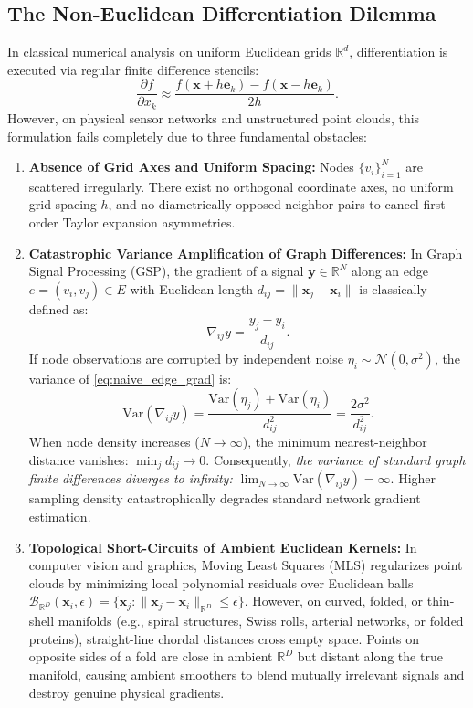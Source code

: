 \documentclass[11pt,a4paper]{article}
\theoremstyle{definition}
\begin{document}
\subsection{The Non-Euclidean Differentiation Dilemma}
In classical numerical analysis on uniform Euclidean grids $\mathbb{R}^d$, differentiation is executed via regular finite difference stencils:
\begin{equation}
\frac{\partial f}{\partial x_k} \approx \frac{f(\mathbf{x} + h \mathbf{e}_k) - f(\mathbf{x} - h \mathbf{e}_k)}{2h}.
\end{equation}
However, on physical sensor networks and unstructured point clouds, this formulation fails completely due to three fundamental obstacles:
\begin{enumerate}
    \item \textbf{Absence of Grid Axes and Uniform Spacing:} Nodes $\{v_i\}_{i=1}^N$ are scattered irregularly. There exist no orthogonal coordinate axes, no uniform grid spacing $h$, and no diametrically opposed neighbor pairs to cancel first-order Taylor expansion asymmetries.
    \item \textbf{Catastrophic Variance Amplification of Graph Differences:} In Graph Signal Processing (GSP), the gradient of a signal $\mathbf{y} \in \mathbb{R}^N$ along an edge $e = (v_i, v_j) \in E$ with Euclidean length $d_{ij} = \|\mathbf{x}_j - \mathbf{x}_i\|$ is classically defined as:
    \begin{equation}
    \nabla_{ij} y = \frac{y_j - y_i}{d_{ij}}.
    \label{eq:naive_edge_grad}
    \end{equation}
    If node observations are corrupted by independent noise $\eta_i \sim \mathcal{N}(0, \sigma^2)$, the variance of \eqref{eq:naive_edge_grad} is:
    \begin{equation}
    \text{Var}(\nabla_{ij} y) = \frac{\text{Var}(\eta_j) + \text{Var}(\eta_i)}{d_{ij}^2} = \frac{2\sigma^2}{d_{ij}^2}.
    \end{equation}
    When node density increases ($N \to \infty$), the minimum nearest-neighbor distance vanishes: $\min_{j} d_{ij} \to 0$. Consequently, \emph{the variance of standard graph finite differences diverges to infinity: $\lim_{N \to \infty} \text{Var}(\nabla_{ij} y) = \infty$}. Higher sampling density catastrophically degrades standard network gradient estimation.
    \item \textbf{Topological Short-Circuits of Ambient Euclidean Kernels:} In computer vision and graphics, Moving Least Squares (MLS) \cite{levin1998, alexa2003} regularizes point clouds by minimizing local polynomial residuals over Euclidean balls $\mathcal{B}_{\mathbb{R}^D}(\mathbf{x}_i, \epsilon) = \{\mathbf{x}_j : \|\mathbf{x}_j - \mathbf{x}_i\|_{\mathbb{R}^D} \le \epsilon\}$. However, on curved, folded, or thin-shell manifolds (e.g., spiral structures, Swiss rolls, arterial networks, or folded proteins), straight-line chordal distances cross empty space. Points on opposite sides of a fold are close in ambient $\mathbb{R}^D$ but distant along the true manifold, causing ambient smoothers to blend mutually irrelevant signals and destroy genuine physical gradients.
\end{enumerate}
\end{document}
